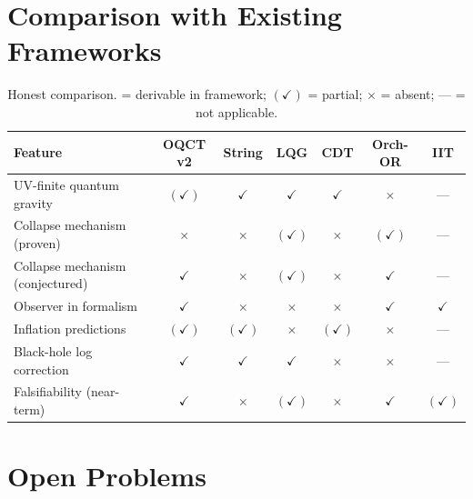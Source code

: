 \documentclass[11pt,a4paper]{article}
\theoremstyle{myrmk}
\begin{document}
\section{Comparison with Existing Frameworks}
\label{sec:comparison}

\begin{table}[H]
\centering\small
\caption{Honest comparison. \checkmark = derivable in framework;
$(\checkmark)$ = partial; $\times$ = absent; --- = not applicable.}
\label{tab:comparison}
\renewcommand{\arraystretch}{1.22}
\begin{tabular}{lcccccc}
\toprule
\textbf{Feature} & \textbf{OQCT v2} & \textbf{String} & \textbf{LQG} & \textbf{CDT}
  & \textbf{Orch-OR} & \textbf{IIT} \\ \midrule
UV-finite quantum gravity         & $(\checkmark)$ & $\checkmark$  & $\checkmark$  & $\checkmark$  & $\times$      & --- \\
Collapse mechanism (proven)        & $\times$       & $\times$      & $(\checkmark)$ & $\times$      & $(\checkmark)$ & --- \\
Collapse mechanism (conjectured)   & $\checkmark$   & $\times$      & $(\checkmark)$ & $\times$      & $\checkmark$  & --- \\
Observer in formalism              & $\checkmark$   & $\times$      & $\times$      & $\times$      & $\checkmark$  & $\checkmark$ \\
Inflation predictions              & $(\checkmark)$ & $(\checkmark)$ & $\times$     & $(\checkmark)$ & $\times$      & --- \\
Black-hole log correction          & $\checkmark$   & $\checkmark$  & $\checkmark$  & $\times$      & $\times$      & --- \\
Falsifiability (near-term)         & $\checkmark$   & $\times$      & $(\checkmark)$ & $\times$      & $\checkmark$  & $(\checkmark)$ \\
\bottomrule
\end{tabular}
\end{table}

\section{Open Problems}
\label{sec:open}
\end{document}
